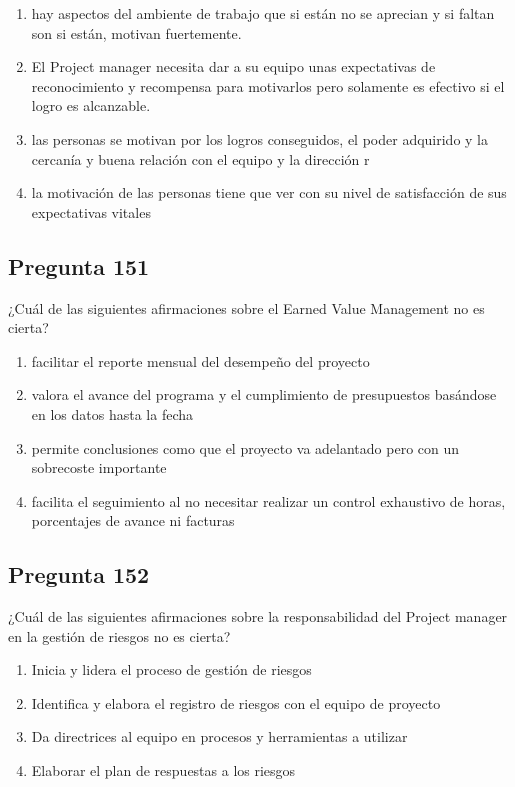 \documentclass[11pt,a4paper]{article}
\begin{document}
\begin{enumerate}[label=\alph*)]
  \item hay aspectos del ambiente de trabajo que si están no se aprecian y si faltan son si están, motivan fuertemente.
  \item El Project manager necesita dar a su equipo unas expectativas de reconocimiento y recompensa para motivarlos pero solamente es efectivo si el logro es alcanzable.
  \item las personas se motivan por los logros conseguidos, el poder adquirido y la cercanía y buena relación con el equipo y la dirección r
  \item la motivación de las personas tiene que ver con su nivel de satisfacción de sus expectativas vitales
\end{enumerate}

\subsection*{Pregunta 151}
¿Cuál de las siguientes afirmaciones sobre el Earned Value Management no es cierta?

\begin{enumerate}[label=\alph*)]
  \item facilitar el reporte mensual del desempeño del proyecto
  \item valora el avance del programa y el cumplimiento de presupuestos basándose en los datos hasta la fecha
  \item permite conclusiones como que el proyecto va adelantado pero con un sobrecoste importante
  \item facilita el seguimiento al no necesitar realizar un control exhaustivo de horas, porcentajes de avance ni facturas
\end{enumerate}

\subsection*{Pregunta 152}
¿Cuál de las siguientes afirmaciones sobre la responsabilidad del Project manager en la gestión de riesgos no es cierta?

\begin{enumerate}[label=\alph*)]
  \item Inicia y lidera el proceso de gestión de riesgos
  \item Identifica y elabora el registro de riesgos con el equipo de proyecto
  \item Da directrices al equipo en procesos y herramientas a utilizar
  \item Elaborar el plan de respuestas a los riesgos
\end{enumerate}
\end{document}
